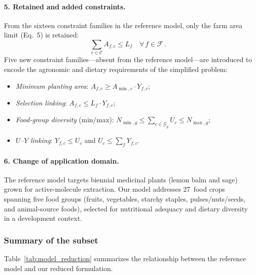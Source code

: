 \paragraph{5. Retained and added constraints.}
From the sixteen constraint families in the reference model, only the farm area limit (Eq.~5) is retained:
\begin{equation}
    \sum_{c \in \mathcal{C}} A_{f,c} \leq L_f \quad \forall\, f \in \mathcal{F}\,.
    \label{eq:land_avail}
\end{equation}
Five new constraint families---absent from the reference model---are introduced to encode the agronomic and dietary requirements of the simplified problem:
\begin{itemize}
    \item \emph{Minimum planting area}: $A_{f,c} \geq A_{\min,c}\cdot Y_{f,c}$;
    \item \emph{Selection linking}: $A_{f,c} \leq L_f \cdot Y_{f,c}$;
    \item \emph{Food-group diversity} (min/max): $N_{\min,g} \leq \sum_{c \in \mathcal{G}_g} U_c \leq N_{\max,g}$;
    \item \emph{$U$--$Y$ linking}: $Y_{f,c} \leq U_c$ and $U_c \leq \sum_{f} Y_{f,c}$.
\end{itemize}

\paragraph{6. Change of application domain.}
The reference model targets biennial medicinal plants (lemon balm and sage) grown for active-molecule extraction. Our model addresses 27~food crops spanning five food groups (fruits, vegetables, starchy staples, pulses/nuts/seeds, and animal-source foods), selected for nutritional adequacy and dietary diversity in a development context.

\subsubsection{Summary of the subset}
Table~\ref{tab:model_reduction} summarizes the relationship between the reference model and our reduced formulation.

